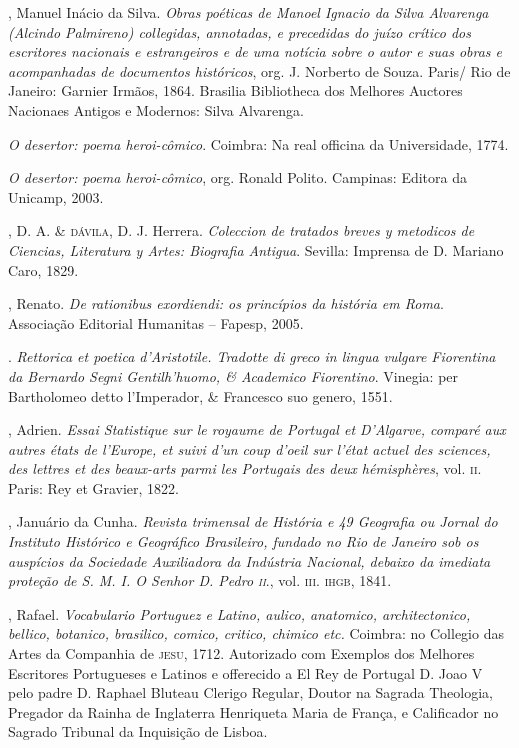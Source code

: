 \begin{bibliohedra}
, Manuel Inácio da Silva. \emph{Obras poéticas de Manoel
Ignacio da Silva Alvarenga (Alcindo Palmireno) collegidas, annotadas, e precedidas do juízo crítico dos escritores nacionais e
estrangeiros e de uma notícia sobre o autor e suas obras e acompanhadas de documentos históricos}, org. J. Norberto de Souza.
Paris/ Rio de Janeiro: Garnier Irmãos, 1864. Brasilia Bibliotheca dos Melhores Auctores Nacionaes Antigos e Modernos:
Silva Alvarenga.

 \emph{O desertor: poema heroi-cômico}. Coimbra: Na real
officina da Universidade, 1774.

 \emph{O desertor: poema heroi-cômico}, org. Ronald Polito.
Campinas: Editora da Unicamp, 2003.

, D. A. \& \textsc{dávila}, D. J. Herrera. \emph{Coleccion de tratados
breves y metodicos de Ciencias, Literatura y Artes: Biografia
Antigua}. Sevilla: Imprensa de D. Mariano Caro, 1829.

, Renato. \emph{De rationibus exordiendi: os princípios da
história em Roma}. Associação Editorial Humanitas – Fapesp,
2005.

. \emph{Rettorica et poetica d’Aristotile. Tradotte di greco
in lingua vulgare Fiorentina da Bernardo Segni Gentilh’huomo,
\& Academico Fiorentino}. Vinegia: per Bartholomeo detto
l’Imperador, \& Francesco suo genero, 1551.

, Adrien. \emph{Essai Statistique sur le royaume de Portugal et
D’Algarve, comparé aux autres états de l’Europe, et suivi d’un
coup d’oeil sur l’état actuel des sciences, des lettres et des beaux-arts parmi les Portugais des deux hémisphères}, vol. \textsc{ii}. Paris: Rey et Gravier, 1822.

, Januário da Cunha. \emph{Revista trimensal de História e 49
Geografia ou Jornal do Instituto Histórico e Geográfico Brasileiro, fundado no Rio de Janeiro sob os auspícios da Sociedade
Auxiliadora da Indústria Nacional, debaixo da imediata proteção
de S. M. I. O Senhor D. Pedro \textsc{ii}}., vol. \textsc{iii}. \textsc{ihgb}, 1841.

, Rafael. \emph{Vocabulario Portuguez e Latino, aulico, anatomico, architectonico, bellico, botanico, brasilico, comico, critico,
chimico etc.} Coimbra: no Collegio das Artes da Companhia de
\textsc{jesu}, 1712. Autorizado com Exemplos dos Melhores Escritores
Portugueses e Latinos e offerecido a El Rey de Portugal D. Joao
V pelo padre D. Raphael Bluteau Clerigo Regular, Doutor na
Sagrada Theologia, Pregador da Rainha de Inglaterra Henriqueta Maria de França, e Calificador no Sagrado Tribunal da
Inquisição de Lisboa.


\end{bibliohedra}
